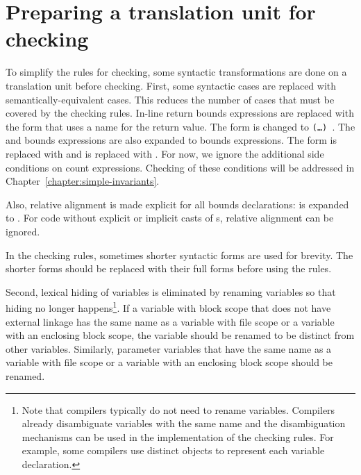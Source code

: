 \section{Preparing a translation unit for checking}

To simplify the rules for checking, some syntactic transformations are done
on a translation unit before checking.  First, some syntactic cases are
replaced with semantically-equivalent cases.  This reduces the number of cases
that must be covered by the checking rules.  In-line return bounds expressions
are replaced with the form that uses a name for the return value. The form
 is changed to 
\texttt{(\ldots{}) 
  }.
The  and
 bounds expressions are also expanded to bounds expressions.
The form 
is replaced with 
and 
is replaced with .
For now, we ignore the additional side conditions on count expressions. Checking of these
conditions will be addressed in Chapter~\ref{chapter:simple-invariants}.

Also, relative alignment is made explicit for all bounds
declarations:  is expanded to
.
For code without explicit or implicit casts of \arrayptr s, relative
alignment can be ignored.

In the checking rules, sometimes shorter syntactic forms are used for
brevity. The shorter forms should be replaced with their full forms before
using the rules.

Second, lexical hiding of variables is eliminated by renaming variables so that
hiding no longer happens\footnote{Note that compilers typically do not need to
rename variables. Compilers already disambiguate variables with the
same name and the disambiguation mechanisms can be used in the implementation
of the checking rules.  For example, some compilers use distinct objects
to represent each variable declaration.}.  If a variable with block scope that does not
have external linkage has the same name as a variable with file scope or
a variable with an enclosing block scope, the variable
should be renamed to be distinct from other variables.  Similarly, parameter
variables that have the same name as a variable with file scope or a
variable with an enclosing block scope should be renamed.

